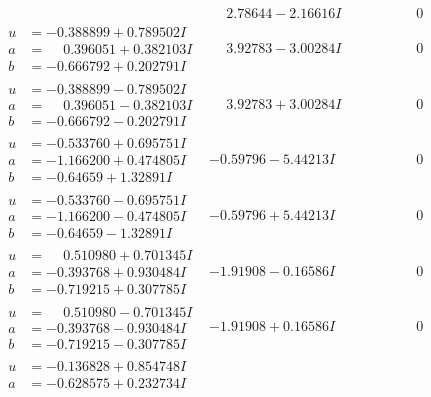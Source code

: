 \documentclass[1p]{elsarticle_modified}
\theoremstyle{definition}
\begin{document}
$$\begin{array}{c|c|c}
 & \phantom{-}2.78644 - 2.16616 I & \phantom{-0.000000 } 0 \\ \hline\begin{aligned}
u &= -0.388899 + 0.789502 I \\
a &= \phantom{-}0.396051 + 0.382103 I \\
b &= -0.666792 + 0.202791 I\end{aligned}
 & \phantom{-}3.92783 - 3.00284 I & \phantom{-0.000000 } 0 \\ \hline\begin{aligned}
u &= -0.388899 - 0.789502 I \\
a &= \phantom{-}0.396051 - 0.382103 I \\
b &= -0.666792 - 0.202791 I\end{aligned}
 & \phantom{-}3.92783 + 3.00284 I & \phantom{-0.000000 } 0 \\ \hline\begin{aligned}
u &= -0.533760 + 0.695751 I \\
a &= -1.166200 + 0.474805 I \\
b &= -0.64659 + 1.32891 I\end{aligned}
 & -0.59796 - 5.44213 I & \phantom{-0.000000 } 0 \\ \hline\begin{aligned}
u &= -0.533760 - 0.695751 I \\
a &= -1.166200 - 0.474805 I \\
b &= -0.64659 - 1.32891 I\end{aligned}
 & -0.59796 + 5.44213 I & \phantom{-0.000000 } 0 \\ \hline\begin{aligned}
u &= \phantom{-}0.510980 + 0.701345 I \\
a &= -0.393768 + 0.930484 I \\
b &= -0.719215 + 0.307785 I\end{aligned}
 & -1.91908 - 0.16586 I & \phantom{-0.000000 } 0 \\ \hline\begin{aligned}
u &= \phantom{-}0.510980 - 0.701345 I \\
a &= -0.393768 - 0.930484 I \\
b &= -0.719215 - 0.307785 I\end{aligned}
 & -1.91908 + 0.16586 I & \phantom{-0.000000 } 0 \\ \hline\begin{aligned}
u &= -0.136828 + 0.854748 I \\
a &= -0.628575 + 0.232734 I \\

\end{aligned}
\end{array}$$
\end{document}
